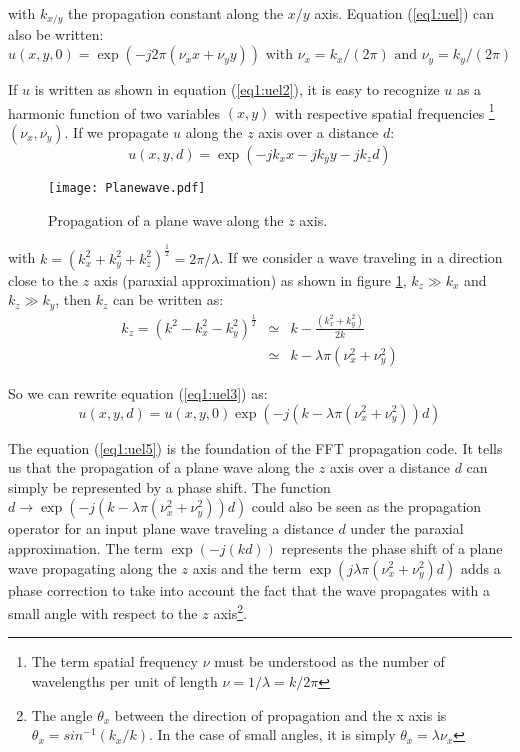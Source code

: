 \noindent with $k_{x/y}$ the propagation constant along the $x/y$ axis. Equation (\ref{eq1:uel}) can also be written:
\begin{equation}
u(x,y,0) = \exp(-j 2 \pi (\nu_x x + \nu_y y)) \mbox{ with } \nu_x = k_x/(2 \pi) \mbox{ and } \nu_y = k_y/(2 \pi)
\label{eq1:uel2}
\end{equation}

If $u$ is written as shown in equation (\ref{eq1:uel2}), it is easy to recognize $u$ as a harmonic function of two variables $(x,y)$ with respective spatial frequencies \footnote{The term spatial frequency $\nu$ must be understood as the number of wavelengths per unit of length $\nu = 1/\lambda = k / 2\pi$} $(\nu_x,\nu_y)$. If we propagate $u$ along the $z$ axis over a distance $d$:
\begin{equation}
u(x,y,d) = \exp(-j k_x x - j k_y y - j k_z d)
\label{eq1:uel3}
\end{equation}

\begin{figure}
\begin{center}
\texttt{[image: Planewave.pdf]}
\end{center}
\caption{\label{fig1:plane} Propagation of a plane wave along the $z$ axis.}
\end{figure}


\noindent with $k =  (k_x^2 + k_y^2 + k_z^2)^{\frac{1}{2}} = 2 \pi / \lambda $. If we consider a wave traveling in a direction close to the $z$ axis (paraxial approximation) as shown in figure \ref{fig1:plane}, $k_z \gg k_x$ and $k_z \gg k_y$, then $k_z$ can be written as:
\begin{eqnarray}
k_z = (k^2 - k_x^2 - k_y^2)^{\frac{1}{2}} & \simeq & k - \frac{(k_x^2 + k_y^2)}{2 k } \label{eq4:uel4a}\\
& \simeq & k - \lambda \pi (\nu_x^2 + \nu_y^2)
\label{eq1:uel4}
\end{eqnarray}

\noindent So we can rewrite equation (\ref{eq1:uel3}) as:
\begin{equation}
u(x,y,d) = u(x,y,0) \exp(-j (k - \lambda \pi (\nu_x^2 + \nu_y^2))d)
\label{eq1:uel5}
\end{equation}

The equation (\ref{eq1:uel5}) is the foundation of the FFT propagation code. It tells us that the propagation of a plane wave along the $z$ axis over a distance $d$ can simply be represented by a phase shift. The function $ d\rightarrow \exp(-j (k - \lambda \pi (\nu_x^2 + \nu_y^2))d)$ could also be seen as the propagation operator for an input plane wave traveling a distance $d$ under the paraxial approximation. The term $\exp(-j (k d))$ represents the phase shift of a plane wave propagating along the $z$ axis and the term $ \exp (j \lambda \pi (\nu_x^2 + \nu_y^2)d)$ adds a phase correction to take into account the fact that the wave propagates with a small angle with respect to the $z$ axis\footnote{The angle $\theta_x$ between the direction of propagation and the x axis is $\theta_x = sin^{-1}(k_x/k)$. In the case of small angles, it is simply $\theta_x = \lambda \nu_x$}.\\


